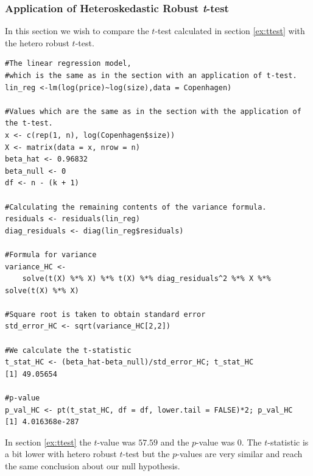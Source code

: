 \subsubsection{Application of Heteroskedastic Robust \textit{t}-test}

In this section we wish to compare the $t$-test calculated in section \ref{ex:ttest} with the hetero robust $t$-test. 
\begin{lstlisting}
#The linear regression model, 
#which is the same as in the section with an application of t-test. 
lin_reg <-lm(log(price)~log(size),data = Copenhagen)

#Values which are the same as in the section with the application of the t-test. 
x <- c(rep(1, n), log(Copenhagen$size))
X <- matrix(data = x, nrow = n)
beta_hat <- 0.96832
beta_null <- 0
df <- n - (k + 1)

#Calculating the remaining contents of the variance formula. 
residuals <- residuals(lin_reg)
diag_residuals <- diag(lin_reg$residuals)

#Formula for variance
variance_HC <- 
    solve(t(X) %*% X) %*% t(X) %*% diag_residuals^2 %*% X %*% solve(t(X) %*% X)
    
#Square root is taken to obtain standard error
std_error_HC <- sqrt(variance_HC[2,2])

#We calculate the t-statistic
t_stat_HC <- (beta_hat-beta_null)/std_error_HC; t_stat_HC
[1] 49.05654

#p-value
p_val_HC <- pt(t_stat_HC, df = df, lower.tail = FALSE)*2; p_val_HC
[1] 4.016368e-287
\end{lstlisting}

In section \ref{ex:ttest} the $t$-value was $57.59$ and the $p$-value was $0$. 
The $t$-statistic is a bit lower with hetero robust $t$-test but the $p$-values are very similar and reach the same conclusion about our null hypothesis. 

